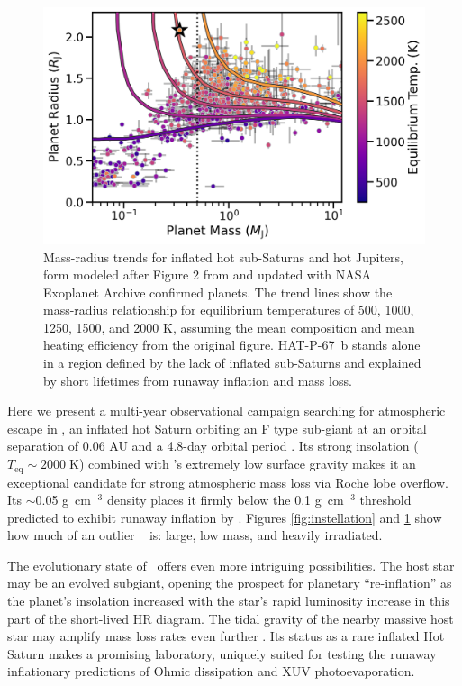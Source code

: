 \documentclass[twocolumn]{aastex631}
\newcommand{\hatp}{\object{HAT-P-67}~}
\newcommand{\hatpb}{\object{HAT-P-67 b}}
\begin{document}
\begin{figure}
    \includegraphics[width=\linewidth]{figures/tf2018_fig2_update2023_HAT.png}
    \caption{Mass-radius trends for inflated hot sub-Saturns and hot Jupiters, form modeled after Figure 2 from \citet{2018AJ....155..214T} and updated with NASA Exoplanet Archive confirmed planets.  The trend lines show the mass-radius relationship for equilibrium temperatures of 500, 1000, 1250, 1500, and 2000 K, assuming the mean composition and mean heating efficiency from the original figure.  HAT-P-67~b stands alone in a region defined by the lack of inflated sub-Saturns and explained by short lifetimes from runaway inflation and mass loss.}
    \label{fig:ThornFortUpdated}
\end{figure}

Here we present a multi-year observational campaign searching for atmospheric escape in , an inflated hot Saturn orbiting an F type sub-giant at an orbital separation of 0.06 AU and a 4.8-day orbital period \citep{2017AJ....153..211Z}.  Its strong insolation ($T_\mathrm{eq}\sim2000\;$K) combined with 's extremely low surface gravity makes it an exceptional candidate for strong atmospheric mass loss via Roche lobe overflow.  Its $\sim$0.05 g~cm$^{-3}$ density places it firmly below the 0.1 g~cm$^{-3}$ threshold predicted to exhibit runaway inflation by \citet{2023ApJ...945L..36T}.  Figures \ref{fig:instellation} and \ref{fig:ThornFortUpdated} show how much of an outlier \hatpb~ is: large, low mass, and heavily irradiated.    

The evolutionary state of \hatp offers even more intriguing possibilities.  The host star may be an evolved subgiant, opening the prospect for planetary ``re-inflation'' \citep{2022AJ....163...53S,2022AJ....163..120G,2023arXiv230306728G} as the planet's insolation increased with the star's rapid luminosity increase in this part of the short-lived HR diagram.  The tidal gravity of the nearby massive host star may amplify mass loss rates even further \citep{2007A&A...472..329E,2023ApJ...945L..36T}. Its status as a rare inflated Hot Saturn makes  a promising laboratory, uniquely suited for testing the runaway inflationary predictions of Ohmic dissipation and XUV photoevaporation.
\end{document}
